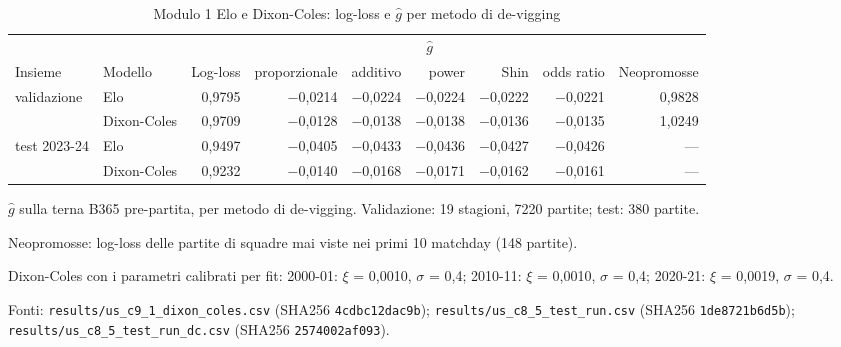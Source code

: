\begin{table}[htbp]
\centering
\small
\setlength{\tabcolsep}{4pt}
\caption{Modulo 1 Elo e Dixon-Coles: log-loss e $\hat g$ per metodo di de-vigging}
\label{tab:dixon_coles}
\begin{tabular}{llrrrrrrr}
\toprule
 &  &  & \multicolumn{5}{c}{$\hat g$} &  \\
\cmidrule(lr){4-8}
Insieme & Modello & Log-loss & proporzionale & additivo & power & Shin & odds ratio & Neopromosse \\
\midrule
validazione & Elo & 0,9795 & $-$0,0214 & $-$0,0224 & $-$0,0224 & $-$0,0222 & $-$0,0221 & 0,9828 \\
 & Dixon-Coles & 0,9709 & $-$0,0128 & $-$0,0138 & $-$0,0138 & $-$0,0136 & $-$0,0135 & 1,0249 \\
\midrule
test 2023-24 & Elo & 0,9497 & $-$0,0405 & $-$0,0433 & $-$0,0436 & $-$0,0427 & $-$0,0426 & --- \\
 & Dixon-Coles & 0,9232 & $-$0,0140 & $-$0,0168 & $-$0,0171 & $-$0,0162 & $-$0,0161 & --- \\
\bottomrule
\end{tabular}

\smallskip
\begin{minipage}{\linewidth}
\footnotesize
$\hat g$ sulla terna B365 pre-partita, per metodo di de-vigging. Validazione: 19 stagioni, 7220 partite; test: 380 partite.\par
Neopromosse: log-loss delle partite di squadre mai viste nei primi 10 matchday (148 partite).\par
Dixon-Coles con i parametri calibrati per fit: 2000-01: $\xi$ = 0,0010, $\sigma$ = 0,4; 2010-11: $\xi$ = 0,0010, $\sigma$ = 0,4; 2020-21: $\xi$ = 0,0019, $\sigma$ = 0,4.\par
Fonti: \texttt{results/us\_c9\_1\_dixon\_coles.csv} (SHA256 \texttt{4cdbc12dac9b}); \texttt{results/us\_c8\_5\_test\_run.csv} (SHA256 \texttt{1de8721b6d5b}); \texttt{results/us\_c8\_5\_test\_run\_dc.csv} (SHA256 \texttt{2574002af093}).
\end{minipage}
\end{table}
